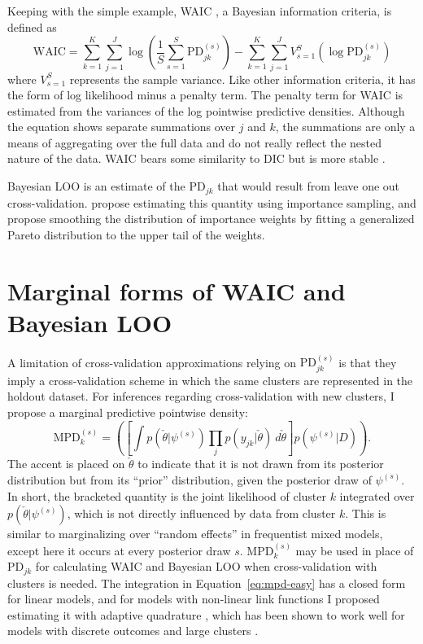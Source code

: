 Keeping with the simple example, WAIC \parencite{watanabe2010asymptotic}, a Bayesian information criteria, is defined as
\begin{equation} \label{eq:waic}
	\mathrm{WAIC} = 
		\sum_{k=1}^K \sum_{j=1}^J \log  
			\left (\frac{1}{S} \sum_{s=1}^{S} \mathrm{PD}_{jk}^{(s)} \right ) -
		\sum_{k=1}^K \sum_{j=1}^J V_{s=1}^{S} 
			\left ( \log \mathrm{PD}_{jk}^{(s)} \right )
\end{equation}
where $V_{s=1}^{S}$ represents the sample variance.
Like other information criteria, it has the form of log likelihood minus a penalty term. The penalty term for WAIC is estimated from the variances of the log pointwise predictive densities. Although the equation shows separate summations over $j$ and $k$, the summations are only a means of aggregating over the full data and do not really reflect the nested nature of the data. WAIC bears some similarity to DIC \parencite{Spiegelhalter2002} but is more stable \parencite{vehtari2015efficient}.

Bayesian LOO is an estimate of the $\mathrm{PD}_{jk}$ that would result from leave one out cross-validation. 
\textcite{gelfand1992model} propose estimating this quantity using importance sampling, and \textcite{vehtari2015efficient} propose smoothing the distribution of importance weights by fitting a generalized Pareto distribution to the upper tail of the weights.


\section{Marginal forms of WAIC and Bayesian LOO}

A limitation of cross-validation approximations relying on $\mathrm{PD}_{jk}^{(s)}$ is that they imply a cross-validation scheme in which the same clusters are represented in the holdout dataset. For inferences regarding cross-validation with new clusters, I propose a marginal predictive pointwise density:
\begin{equation} \label{eq:mpd-easy}
	\mathrm{MPD}_{k}^{(s)} = 
	\left (
		\left [ \int
			p(\check \theta | \psi^{(s)})
			\prod_{j} p(y_{jk} | \check \theta)
			~d \check \theta
    \right ]
		p(\psi^{(s)} | D)
	\right )
.\end{equation}
The accent is placed on $\check \theta$ to indicate that it is not 
drawn from its posterior distribution but from its ``prior'' distribution, given the posterior draw of $\psi^{(s)}$. 
In short, the bracketed quantity is the joint likelihood of cluster $k$ integrated over $p(\check \theta | \psi^{(s)})$, which is not directly influenced by data from cluster $k$.
This is similar to marginalizing over ``random effects'' in frequentist mixed models, except here it occurs at every posterior draw $s$. $\mathrm{MPD}_{k}^{(s)}$ may be used in place of $\mathrm{PD}_{jk}$ for calculating WAIC and Bayesian LOO when cross-validation with clusters is needed. The integration in Equation~\ref{eq:mpd-easy} has a closed form for linear models, and for models with non-linear link functions I proposed estimating it with adaptive quadrature \parencite{naylor1982applications}, which has been shown to work well for models with discrete outcomes and large clusters \parencite{rabe2005maximum}.

